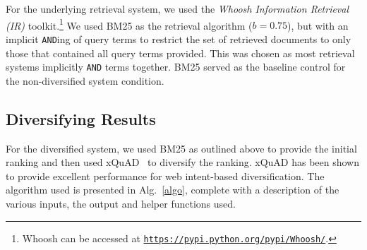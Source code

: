 For the underlying retrieval system, we used the \emph{Whoosh Information Retrieval (IR)} toolkit.\footnote{Whoosh can be accessed at \texttt{\url{https://pypi.python.org/pypi/Whoosh/}}.} We used BM25 as the retrieval algorithm ($b=0.75$), but with an implicit \texttt{AND}ing of query terms to restrict the set of retrieved documents to only those that contained all query terms provided. This was chosen as most retrieval systems implicitly \texttt{AND} terms together. BM25 served as the baseline control for the non-diversified system condition.


\subsection{Diversifying Results}
For the diversified system, we used BM25 as outlined above to provide the initial ranking and then used xQuAD~\cite{santos2010query_reformulations_diversification} to diversify the ranking. xQuAD has been shown to provide excellent performance for web intent-based diversification. The algorithm used is presented in Alg.~\ref{algo}, complete with a description of the various inputs, the output and helper functions used.

